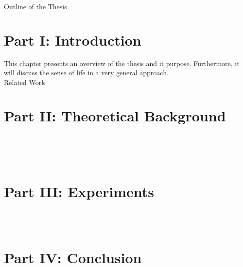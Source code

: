 \clearemptydoublepage

{}

\begin{center}
    \huge{Outline of the Thesis}
\end{center}

\section*{Part I: Introduction}

  \vspace{1mm}
\noindent  This chapter presents an overview of the thesis and it purpose. Furthermore, it will discuss the sense of life in a very general approach. \\

  \vspace{1mm}
\noindent Related Work \\

\section*{Part II: Theoretical Background}

  \vspace{1mm} \\

  \vspace{1mm} \\

  \vspace{1mm} \\

\section*{Part III: Experiments}
  \vspace{1mm} \\

  \vspace{1mm} \\

\section*{Part IV: Conclusion}
  \vspace{1mm} \\
